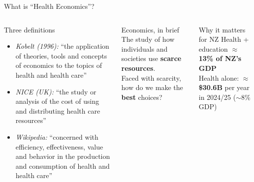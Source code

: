 \documentclass[aspectratio=169, 12pt]{beamer}
\begin{document}
\begin{frame}{What is ``Health Economics''?}
  \begin{columns}
      \begin{block}{Three definitions}
        \footnotesize
        \begin{itemize}
          \item \textit{Kobelt (1996):} ``the application of theories, tools and concepts
                of economics to the topics of health and health care''
          \item \textit{NICE (UK):} ``the study or analysis of the cost of using and
                distributing health care resources''
          \item \textit{Wikipedia:} ``concerned with efficiency, effectiveness, value and
                behavior in the production and consumption of health and health care''
        \end{itemize}
      \end{block}
      \begin{alertblock}{Economics, in brief}
        The study of how individuals and societies use \textbf{scarce resources}.\\[0.4em]
        Faced with scarcity, how do we make the \textbf{best} choices?
      \end{alertblock}
      \vspace{0.4em}
      \begin{exampleblock}{Why it matters for NZ}
        Health + education $\approx$ \textbf{13\% of NZ's GDP}\\
        Health alone: $\approx$\textbf{\$30.6B} per year in 2024/25 ($\sim$8\% GDP)
      \end{exampleblock}
  \end{columns}
\end{frame}
\end{document}

